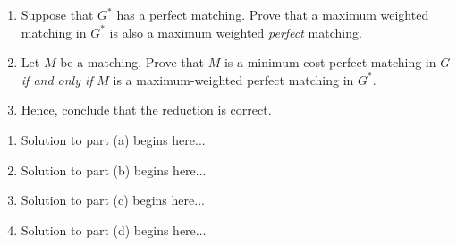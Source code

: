 \documentclass{article}
\begin{document}
\begin{question}
\begin{enumerate}[label = (\alph*)]
    \item Suppose that $G^*$ has a perfect matching. Prove that a maximum weighted matching in $G^*$ is also a maximum weighted {\em perfect} matching.

    \item Let $M$ be a matching. Prove that $M$ is a minimum-cost perfect matching in $G$ {\em if and only if} $M$ is a maximum-weighted perfect matching in $G^*$.

    \item Hence, conclude that the reduction is correct.
\end{enumerate}
\end{question}

\begin{solution}
\begin{enumerate}[label = (\alph*)]
    \item Solution to part (a) begins here...
    
    \item Solution to part (b) begins here...
    
    \item Solution to part (c) begins here...

    \item Solution to part (d) begins here...
\end{enumerate}
\end{solution}
\end{document}
